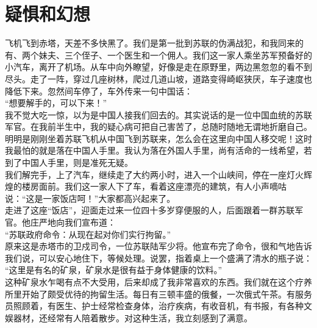 \fancyhead[RO]{\thepage} %
\fancyhead[LE]{\thepage} %
\chapter*{疑惧和幻想}
飞机飞到赤塔，天差不多快黑了。我们是第一批到苏联的伪满战犯，和我同来的有、两个妹夫、三个侄子、一个医生和一个佣人。我们这一家人乘坐苏军预备好的小汽车，离开了机场。从车中向外瞭望，好像是走在原野里，两边黑忽忽的看不到尽头。走了一阵，穿过几座树林，爬过几道山坡，道路变得崎岖狭厌，车子速度也降低下来。忽然间车停了，车外传来一句中国话：\\

“想要解手的，可以下来！”\\

我不觉大吃一惊，以为是中国人接我们回去的。其实说话的是一位中国血统的苏联军官。在我前半生中，我的疑心病可把自己害苦了，总随时随地无谓地折磨自己。明明是刚刚坐着苏联飞机从中国飞到苏联来，怎么会在这里向中国人移交呢！这时我最怕的就是落在中国人手里。我认为落在外国人手里，尚有活命的一线希望，若到了中国人手里，则是准死无疑。\\

我们解完手，上了汽车，继续走了大约两小时，进入一个山峡间，停在一座灯火辉煌的楼房面前。我们这一家人下了车，看着这座漂亮的建筑，有人小声嘀咕说：“这是一家饭店呵！”大家都高兴起来了。\\

走进了这座“饭店”，迎面走过来一位四十多岁穿便服的人，后面跟着一群苏联军官。他庄严地向我们宣布道：\\

“苏联政府命令：从现在起对你们实行拘留。”\\

原来这是赤塔市的卫戍司令，一位苏联陆军少将。他宣布完了命令，很和气地告诉我们说，可以安心地住下，等候处理。说罢，指着桌上一个盛满了清水的瓶子说：\\

“这里是有名的矿泉，矿泉水是很有益于身体健康的饮料。”\\

这种矿泉水乍喝有点不大受用，后来却成了我非常喜欢的东西。我们就在这个疗养所里开始了颇受优待的拘留生活。每日有三顿丰盛的俄餐，一次俄式午茶。有服务员照顾着，有医生、护士经常检查身体，治疗疾病，有收音机，有书报，有各种文娱器材，还经常有人陪着散步。对这种生活，我立刻感到了满意。\\


